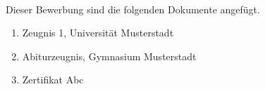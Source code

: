 \documentclass{../letter/applicationletter}
\author{Max Mustermann}
\date{}
\begin{document}
	\begin{letter}{ ~}
		
		
		\opening{Dieser Bewerbung sind die folgenden Dokumente angefügt.}

		\begin{enumerate}
			\item Zeugnis 1,  Universität Musterstadt
			\item Abiturzeugnis, Gymnasium Musterstadt
			\item Zertifikat Abc
		\end{enumerate}
		
	\end{letter}
\end{document}
